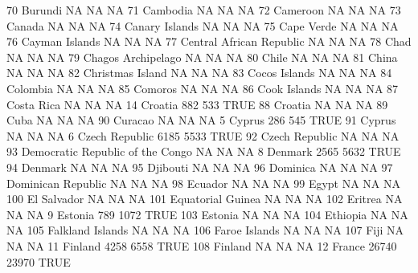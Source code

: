\documentclass [a4paper] {article}
\begin{document}
\begin{Schunk}
\begin{Soutput}
70                              Burundi    NA    NA   NA
71                             Cambodia    NA    NA   NA
72                             Cameroon    NA    NA   NA
73                               Canada    NA    NA   NA
74                       Canary Islands    NA    NA   NA
75                           Cape Verde    NA    NA   NA
76                       Cayman Islands    NA    NA   NA
77             Central African Republic    NA    NA   NA
78                                 Chad    NA    NA   NA
79                   Chagos Archipelago    NA    NA   NA
80                                Chile    NA    NA   NA
81                                China    NA    NA   NA
82                     Christmas Island    NA    NA   NA
83                        Cocos Islands    NA    NA   NA
84                             Colombia    NA    NA   NA
85                              Comoros    NA    NA   NA
86                         Cook Islands    NA    NA   NA
87                           Costa Rica    NA    NA   NA
14                              Croatia   882   533 TRUE
88                              Croatia    NA    NA   NA
89                                 Cuba    NA    NA   NA
90                              Curacao    NA    NA   NA
5                                Cyprus   286   545 TRUE
91                               Cyprus    NA    NA   NA
6                        Czech Republic  6185  5533 TRUE
92                       Czech Republic    NA    NA   NA
93     Democratic Republic of the Congo    NA    NA   NA
8                               Denmark  2565  5632 TRUE
94                              Denmark    NA    NA   NA
95                             Djibouti    NA    NA   NA
96                             Dominica    NA    NA   NA
97                   Dominican Republic    NA    NA   NA
98                              Ecuador    NA    NA   NA
99                                Egypt    NA    NA   NA
100                         El Salvador    NA    NA   NA
101                   Equatorial Guinea    NA    NA   NA
102                             Eritrea    NA    NA   NA
9                               Estonia   789  1072 TRUE
103                             Estonia    NA    NA   NA
104                            Ethiopia    NA    NA   NA
105                    Falkland Islands    NA    NA   NA
106                       Faroe Islands    NA    NA   NA
107                                Fiji    NA    NA   NA
11                              Finland  4258  6558 TRUE
108                             Finland    NA    NA   NA
12                               France 26740 23970 TRUE

\end{Soutput}
\end{Schunk}
\end{document}
